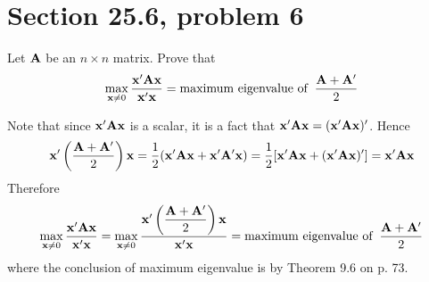\section{Section 25.6, problem 6}
Let $\bf A$ be an $n\times n$ matrix.
Prove that
$$\max_{{\bf x}\ne0}
{{\bf x}'{\bf A}{\bf x}\over{\bf x}'{\bf x}}
=\hbox{maximum eigenvalue of}\;\;{{\bf A}+{\bf A}'\over 2}
$$

\bigskip
\noindent
Note that since ${\bf x}'{\bf Ax}$ is a scalar,
it is a fact that ${\bf x}'{\bf Ax}=({\bf x}'{\bf Ax})'$.
Hence
$${\bf x}'\left({\bf A}+{\bf A}'\over2\right){\bf x}
={1\over2}({\bf x}'{\bf A}{\bf x}+{\bf x}'{\bf A}'{\bf x})
={1\over2}[{\bf x}'{\bf A}{\bf x}+({\bf x}'{\bf A}{\bf x})']
={\bf x}'{\bf A}{\bf x}
$$
Therefore
$$\max_{{\bf x}\ne0}
{{\bf x}'{\bf A}{\bf x}\over{\bf x}'{\bf x}}
=\max_{{\bf x}\ne0}
{{\bf x}'\left(
\displaystyle{{\bf A}+{\bf A}'\over2}
\right){\bf x}\over{\bf x}'{\bf x}}
=\hbox{maximum eigenvalue of}\;\;{{\bf A}+{\bf A}'\over 2}
$$
where the conclusion of maximum eigenvalue is by Theorem 9.6
on p. 73.
